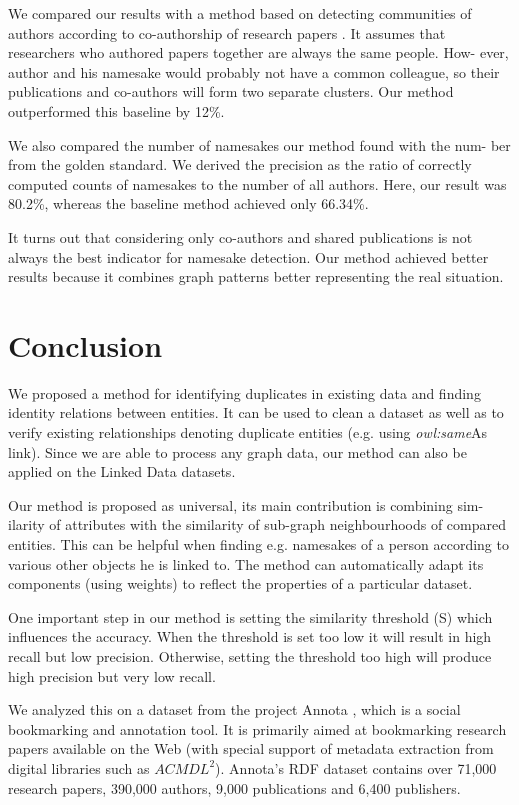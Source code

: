 \documentclass{llncs}
\begin{document}
We compared our results with a method based on detecting communities
of authors according to co-authorship of research papers \cite{19}. It assumes that
researchers who authored papers together are always the same people. How-
ever, author and his namesake would probably not have a common colleague, so
their publications and co-authors will form two separate clusters. Our method
outperformed this baseline by 12\%.

We also compared the number of namesakes our method found with the num-
ber from the golden standard. We derived the precision as the ratio of correctly
computed counts of namesakes to the number of all authors. Here, our result
was 80.2\%, whereas the baseline method achieved only 66.34\%.

It turns out that considering only co-authors and shared publications is not
always the best indicator for namesake detection. Our method achieved better
results because it combines graph patterns better representing the real situation.

\section{Conclusion}

We proposed a method for identifying duplicates in existing data and finding
identity relations between entities. It can be used to clean a dataset as well as to
verify existing relationships denoting duplicate entities (e.g. using \textit{owl:same}As
link). Since we are able to process any graph data, our method can also be
applied on the Linked Data datasets.

Our method is proposed as universal, its main contribution is combining sim-
ilarity of attributes with the similarity of sub-graph neighbourhoods of compared
entities. This can be helpful when finding e.g. namesakes of a person according
to various other objects he is linked to. The method can automatically adapt its
components (using weights) to reflect the properties of a particular dataset.

One important step in our method is setting the similarity threshold (S)
which influences the accuracy. When the threshold is set too low it will result
in high recall but low precision. Otherwise, setting the threshold too high will
produce high precision but very low recall.

We analyzed this on a dataset from the project Annota \cite{4}, which is a social
bookmarking and annotation tool. It is primarily aimed at bookmarking research
papers available on the Web (with special support of metadata extraction from
digital libraries such as $ACM DL^2$). Annota's RDF dataset contains over 71,000
research papers, 390,000 authors, 9,000 publications and 6,400 publishers.
\end{document}
